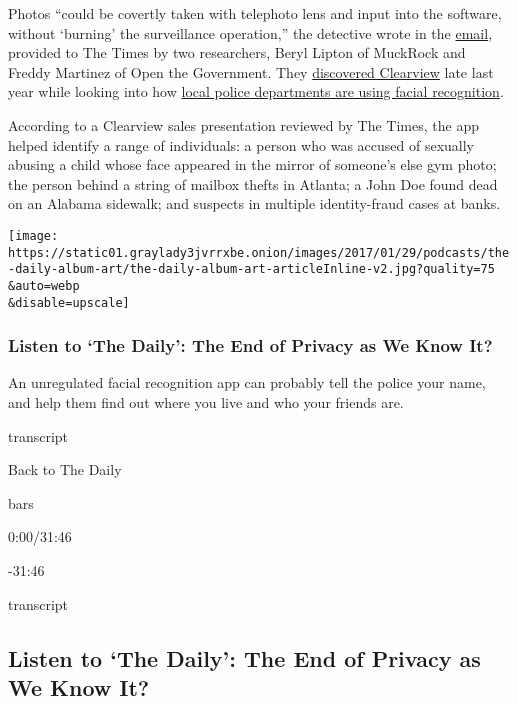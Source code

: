 Photos ``could be covertly taken with telephoto lens and input into the
software, without `burning' the surveillance operation,'' the detective
wrote in the
\href{https://www.muckrock.com/foi/clifton-6861/clifton-nj-83767/}{email},
provided to The Times by two researchers, Beryl Lipton of MuckRock and
Freddy Martinez of Open the Government. They
\href{https://www.muckrock.com/news/archives/2020/jan/18/clearview-ai-facial-recogniton-records/}{discovered
Clearview} late last year while looking into how
\href{https://www.muckrock.com/project/police-surveillance-facial-recognition-use-in-your-backyard-452/}{local
police departments are using facial recognition}.

According to a Clearview sales presentation reviewed by The Times, the
app helped identify a range of individuals: a person who was accused of
sexually abusing a child whose face appeared in the mirror of someone's
else gym photo; the person behind a string of mailbox thefts in Atlanta;
a John Doe found dead on an Alabama sidewalk; and suspects in multiple
identity-fraud cases at banks.

\texttt{[image: https://static01.graylady3jvrrxbe.onion/images/2017/01/29/podcasts/the-daily-album-art/the-daily-album-art-articleInline-v2.jpg?quality=75\\\&auto=webp\\\&disable=upscale]}

\hypertarget{listen-to-the-daily-the-end-of-privacy-as-we-know-it}{%
\subsubsection{Listen to `The Daily': The End of Privacy as We Know
It?}\label{listen-to-the-daily-the-end-of-privacy-as-we-know-it}}

An unregulated facial recognition app can probably tell the police your
name, and help them find out where you live and who your friends are.

transcript

Back to The Daily

bars

0:00/31:46

-31:46

transcript

\hypertarget{listen-to-the-daily-the-end-of-privacy-as-we-know-it-1}{%
\subsection{Listen to `The Daily': The End of Privacy as We Know
It?}\label{listen-to-the-daily-the-end-of-privacy-as-we-know-it-1}}

